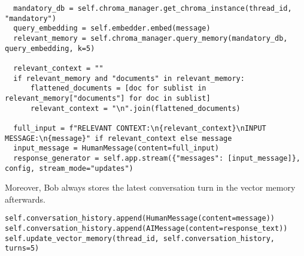 \documentclass[conference]{IEEEtran}
\begin{document}
\begin{verbatim}
  mandatory_db = self.chroma_manager.get_chroma_instance(thread_id, "mandatory")
  query_embedding = self.embedder.embed(message)
  relevant_memory = self.chroma_manager.query_memory(mandatory_db, query_embedding, k=5)
  
  relevant_context = ""
  if relevant_memory and "documents" in relevant_memory:
      flattened_documents = [doc for sublist in relevant_memory["documents"] for doc in sublist]
      relevant_context = "\n".join(flattened_documents)
  
  full_input = f"RELEVANT CONTEXT:\n{relevant_context}\nINPUT MESSAGE:\n{message}" if relevant_context else message
  input_message = HumanMessage(content=full_input)
  response_generator = self.app.stream({"messages": [input_message]}, config, stream_mode="updates")
\end{verbatim}

Moreover, Bob always stores the latest conversation turn in the vector memory afterwards.

\begin{verbatim}
self.conversation_history.append(HumanMessage(content=message))
self.conversation_history.append(AIMessage(content=response_text))
self.update_vector_memory(thread_id, self.conversation_history, turns=5)
\end{verbatim}
\end{document}
